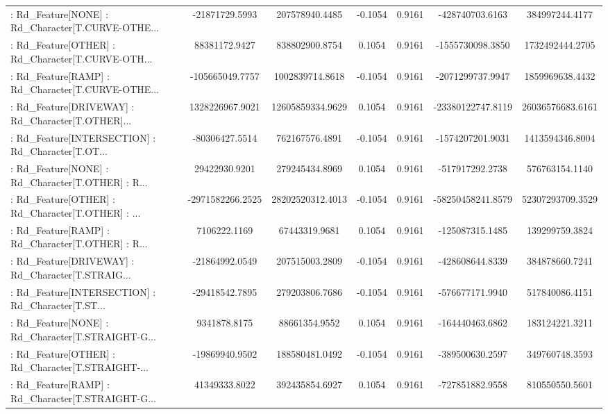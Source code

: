 \begin{longtable}{p{4cm}cccccc}
 : Rd\_Feature[NONE] : Rd\_Character[T.CURVE-OTHE... &    -21871729.5993 &    207578940.4485 & -0.1054 &       0.9161 &    -428740703.6163 &    384997244.4177 \\
 : Rd\_Feature[OTHER] : Rd\_Character[T.CURVE-OTH... &     88381172.9427 &    838802900.8754 &  0.1054 &       0.9161 &   -1555730098.3850 &   1732492444.2705 \\
 : Rd\_Feature[RAMP] : Rd\_Character[T.CURVE-OTHE... &   -105665049.7757 &   1002839714.8618 & -0.1054 &       0.9161 &   -2071299737.9947 &   1859969638.4432 \\
 : Rd\_Feature[DRIVEWAY] : Rd\_Character[T.OTHER]... &   1328226967.9021 &  12605859334.9629 &  0.1054 &       0.9161 &  -23380122747.8119 &  26036576683.6161 \\
 : Rd\_Feature[INTERSECTION] : Rd\_Character[T.OT... &    -80306427.5514 &    762167576.4891 & -0.1054 &       0.9161 &   -1574207201.9031 &   1413594346.8004 \\
 : Rd\_Feature[NONE] : Rd\_Character[T.OTHER] : R... &     29422930.9201 &    279245434.8969 &  0.1054 &       0.9161 &    -517917292.2738 &    576763154.1140 \\
 : Rd\_Feature[OTHER] : Rd\_Character[T.OTHER] : ... &  -2971582266.2525 &  28202520312.4013 & -0.1054 &       0.9161 &  -58250458241.8579 &  52307293709.3529 \\
 : Rd\_Feature[RAMP] : Rd\_Character[T.OTHER] : R... &      7106222.1169 &     67443319.9681 &  0.1054 &       0.9161 &    -125087315.1485 &    139299759.3824 \\
 : Rd\_Feature[DRIVEWAY] : Rd\_Character[T.STRAIG... &    -21864992.0549 &    207515003.2809 & -0.1054 &       0.9161 &    -428608644.8339 &    384878660.7241 \\
 : Rd\_Feature[INTERSECTION] : Rd\_Character[T.ST... &    -29418542.7895 &    279203806.7686 & -0.1054 &       0.9161 &    -576677171.9940 &    517840086.4151 \\
 : Rd\_Feature[NONE] : Rd\_Character[T.STRAIGHT-G... &      9341878.8175 &     88661354.9552 &  0.1054 &       0.9161 &    -164440463.6862 &    183124221.3211 \\
 : Rd\_Feature[OTHER] : Rd\_Character[T.STRAIGHT-... &    -19869940.9502 &    188580481.0492 & -0.1054 &       0.9161 &    -389500630.2597 &    349760748.3593 \\
 : Rd\_Feature[RAMP] : Rd\_Character[T.STRAIGHT-G... &     41349333.8022 &    392435854.6927 &  0.1054 &       0.9161 &    -727851882.9558 &    810550550.5601 \\

\end{longtable}
